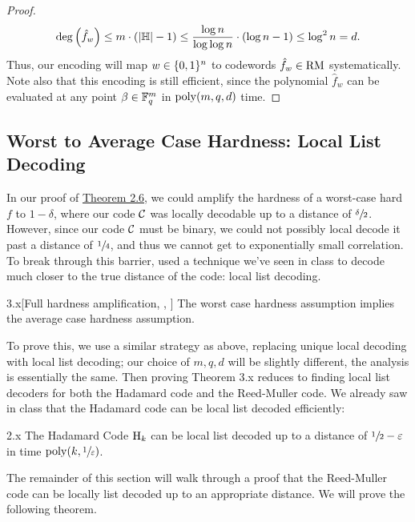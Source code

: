 \documentclass[11pt]{article}
\begin{document}
\begin{proof}
    \begin{equation*}
        \deg \left(\hat{f}_w\right) \leq m \cdot (|\mathbb{H}| - 1) \leq \frac{\log n}{\log \log n} \cdot \left(\log n - 1\right) \leq \log^2 n = d.
    \end{equation*}
    Thus, our encoding will map $w \in \{0, 1\}^n$ to codewords $\hat{f}_w \in \mathrm{RM}$ systematically. Note also that this encoding is still efficient, since the polynomial $\hat{f}_w$ can be evaluated at any point $\beta \in \mathbb{F}_q^m$ in $\mathrm{poly}(m, q, d)$ time.
\end{proof}

\subsection{Worst to Average Case Hardness: Local List Decoding}

In our proof of \hyperref[t-2-6]{Theorem 2.6}, we could amplify the hardness of a worst-case hard $f$ to $1 - \delta$, where our code $\mathcal{C}$ was locally decodable up to a distance of $\sfrac{\delta}{2}$. However, since our code $\mathcal{C}$ must be binary, we could not possibly local decode it past a distance of $\sfrac{1}{4}$, and thus we cannot get to exponentially small correlation. To break through this barrier, \cite{STV99} used a technique we've seen in class to decode much closer to the true distance of the code: local list decoding.

\begin{theorem}{3.x}[Full hardness amplification, \cite{iw97}, \cite{STV99}]
    The worst case hardness assumption implies the average case hardness assumption.
\end{theorem}

To prove this, we use a similar strategy as above, replacing unique local decoding with local list decoding; our choice of $m, q, d$ will be slightly different, the analysis is essentially the same. Then proving Theorem 3.x reduces to finding local list decoders for both the Hadamard code and the Reed-Muller code. We already saw in class that the Hadamard code can be local list decoded efficiently:

\begin{theorem}{2.x}
    The Hadamard Code $\mathrm{H}_k$ can be local list decoded up to a distance of $\sfrac{1}{2} - \varepsilon$ in time $\mathrm{poly}(k, \sfrac{1}{\varepsilon})$.
\end{theorem}

The remainder of this section will walk through a proof that the Reed-Muller code can be locally list decoded up to an appropriate distance. We will prove the following theorem.
\end{document}
